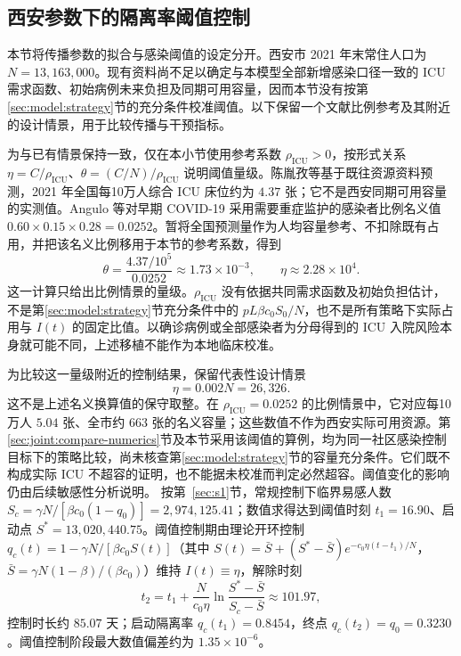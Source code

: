 \documentclass[lang=cn,a4paper,newtx]{elegantpaper}
\numberwithin{equation}{section}
\theoremstyle{plain}
\begin{document}
\subsection{西安参数下的隔离率阈值控制}
\label{sec:xian:threshold-scale}
本节将传播参数的拟合与感染阈值的设定分开。西安市 2021 年末常住人口为 $N=13{,}163{,}000$\cite{XianStat2021}。现有资料尚不足以确定与本模型全部新增感染口径一致的 ICU 需求函数、初始病例未来负担及同期可用容量，因而本节没有按第\ref{sec:model:strategy}节的充分条件校准阈值。以下保留一个文献比例参考及其附近的设计情景，用于比较传播与干预指标。

为与已有情景保持一致，仅在本小节使用参考系数 $\rho_{\mathrm{ICU}}>0$，按形式关系 $\eta=C/\rho_{\mathrm{ICU}}$、$\theta=(C/N)/\rho_{\mathrm{ICU}}$ 说明阈值量级。陈胤孜等\cite{Chen2021ICUForecast}基于既往资源资料预测，2021 年全国每10万人综合 ICU 床位约为 $4.37$ 张；它不是西安同期可用容量的实测值。Angulo 等\cite[补充材料 S4.1]{Angulo2021}对早期 COVID-19 采用需要重症监护的感染者比例名义值 $0.60\times0.15\times0.28=0.0252$。暂将全国预测量作为人均容量参考、不扣除既有占用，并把该名义比例移用于本节的参考系数，得到
\[
\theta=\frac{4.37/10^5}{0.0252}\approx1.73\times10^{-3},
\qquad \eta\approx2.28\times10^4.
\]
这一计算只给出比例情景的量级。$\rho_{\mathrm{ICU}}$ 没有依据共同需求函数及初始负担估计，不是第\ref{sec:model:strategy}节充分条件中的 $pL\beta c_0S_0/N$，也不是所有策略下实际占用与 $I(t)$ 的固定比值。以确诊病例或全部感染者为分母得到的 ICU 入院风险本身就可能不同\cite{Pung2023Undetected}，上述移植不能作为本地临床校准。

为比较这一量级附近的控制结果，保留代表性设计情景
\begin{equation}
\eta=0.002N=26{,}326.
\end{equation}
这不是上述名义换算值的保守取整。在 $\rho_{\mathrm{ICU}}=0.0252$ 的比例情景中，它对应每10万人 $5.04$ 张、全市约 $663$ 张的名义容量；这些数值不作为西安实际可用资源。第\ref{sec:joint:compare-numerics}节及本节采用该阈值的算例，均为同一社区感染控制目标下的策略比较，尚未核查第\ref{sec:model:strategy}节的容量充分条件。它们既不构成实际 ICU 不超容的证明，也不能据未校准而判定必然超容。阈值变化的影响仍由后续敏感性分析说明。
按第~\ref{sec:s1}节，常规控制下临界易感人数 $S_c=\gamma N/[\beta c_0(1-q_0)]=2{,}974{,}125.41$；数值求得达到阈值时刻 $t_1=16.90$、启动点 $S^*=13{,}020{,}440.75$。阈值控制期由理论开环控制 $q_c(t)=1-\gamma N/[\beta c_0 S(t)]$（其中 $S(t)=\bar S+(S^*-\bar S)e^{-c_0\eta(t-t_1)/N}$，$\bar S=\gamma N(1-\beta)/(\beta c_0)$）维持 $I(t)\equiv\eta$，解除时刻
\[
t_2=t_1+\frac{N}{c_0\eta}\ln\frac{S^*-\bar S}{S_c-\bar S}\approx101.97,
\]
控制时长约 $85.07$ 天；启动隔离率 $q_c(t_1)=0.8454$，终点 $q_c(t_2)=q_0=0.3230$。阈值控制阶段最大数值偏差约为 $1.35\times10^{-6}$。
\end{document}
